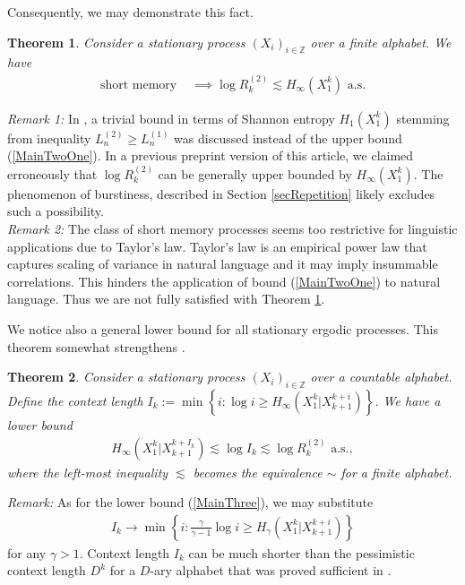 \documentclass[a4paper,12pt]{article}
\newcommand{\klam}[1]{\left\{ #1 \right\}}
\newtheorem{theorem}{Theorem}
\begin{document}
Consequently, we may demonstrate this fact.
\begin{theorem}
  \label{theoMainTwo}
  Consider a stationary process $(X_i)_{i\in\mathbb{Z}}$ over a finite
  alphabet. We have
  \begin{align}
    \label{MainTwoOne}
    \text{short memory } %
    &\implies
    \log R^{(2)}_k\lesssim
    H_\infty(X_1^k)
      \text{ a.s.}
  \end{align}
\end{theorem}
\noindent
\emph{Remark 1:} In \cite{Debowski18b,Debowski21}, a trivial bound in
terms of Shannon entropy $H_1(X_1^k)$ stemming from inequality
$L^{(2)}_n\ge L^{(1)}_n$ was discussed instead of the upper bound
(\ref{MainTwoOne}). In a previous preprint version of this article, we
claimed erroneously that $\log R^{(2)}_k$ can be generally upper
bounded by $H_\infty(X_1^k)$. The phenomenon of burstiness, described
in Section \ref{secRepetition} likely excludes such a possibility.
\\
\emph{Remark 2:} The class of short memory processes seems too
restrictive for linguistic applications due to Taylor's law. Taylor's
law is an empirical power law that captures scaling of variance in
natural language
\cite{GerlachAltmann14,KobayashiTanakaIshii2018,TanakaIshii21} and it
may imply insummable correlations. This hinders the application of
bound (\ref{MainTwoOne}) to natural language. Thus we are not fully
satisfied with Theorem \ref{theoMainTwo}.

We notice also a general lower bound for all stationary ergodic
processes. This theorem somewhat strengthens \cite[Theorem
8]{Debowski18b}.
\begin{theorem}
  \label{theoMainThree} 
  Consider a stationary process $(X_i)_{i\in\mathbb{Z}}$ over a
  countable alphabet. Define the context length
  $I_k:=\min\klam{i:\log i\ge H_\infty(X_1^k|X_{k+1}^{k+i})}$.
  We have a lower bound
  \begin{align}
    \label{MainThree}
    H_\infty(X_1^k|X_{k+1}^{k+I_k})\lesssim
    \log I_k\lesssim
    \log R^{(2)}_k
    \text{ a.s.}
    ,
  \end{align}
  where the left-most inequality $\lesssim$ becomes the equivalence
  $\sim$ for a finite alphabet.  
\end{theorem}
\noindent
\emph{Remark:} As for the lower bound (\ref{MainThree}), we may
substitute
\begin{align*}
  I_k\to\min\klam{i:\frac{\gamma}{\gamma-1}\log i\ge
  H_\gamma(X_1^k|X_{k+1}^{k+i})}
\end{align*}
for any $\gamma>1$.  Context length $I_k$ can be much shorter than the
pessimistic context length $D^k$ for a $D$-ary alphabet that was
proved sufficient in \cite[Theorem 8]{Debowski18b}.
\end{document}
